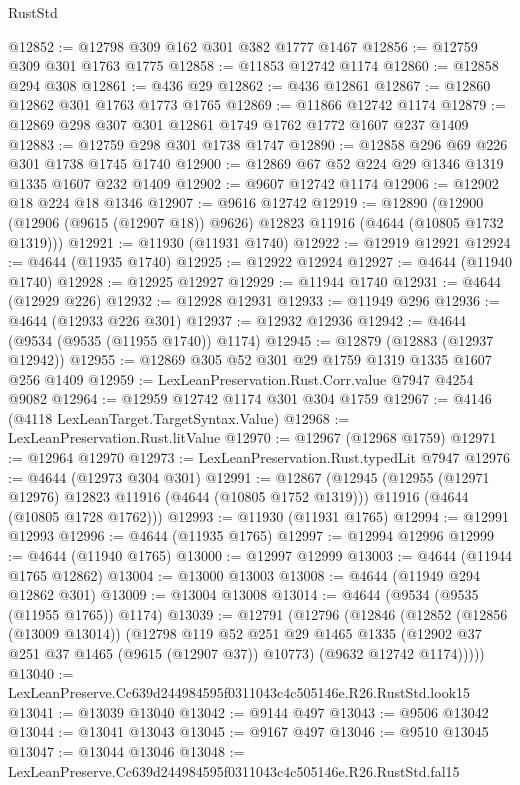 \begin{lexlean}{RustStd}
\begin{coremodule}
@12852 := @12798 @309 @162 @301 @382 @1777 @1467
@12856 := @12759 @309 @301 @1763 @1775
@12858 := @11853 @12742 @1174
@12860 := @12858 @294 @308
@12861 := @436 @29
@12862 := @436 @12861
@12867 := @12860 @12862 @301 @1763 @1773 @1765
@12869 := @11866 @12742 @1174
@12879 := @12869 @298 @307 @301 @12861 @1749 @1762 @1772 @1607 @237 @1409
@12883 := @12759 @298 @301 @1738 @1747
@12890 := @12858 @296 @69 @226 @301 @1738 @1745 @1740
@12900 := @12869 @67 @52 @224 @29 @1346 @1319 @1335 @1607 @232 @1409
@12902 := @9607 @12742 @1174
@12906 := @12902 @18 @224 @18 @1346
@12907 := @9616 @12742
@12919 := @12890
    (@12900 (@12906 (@9615 (@12907 @18)) @9626) @12823 @11916 (@4644 (@10805 @1732 @1319)))
@12921 := @11930 (@11931 @1740)
@12922 := @12919 @12921
@12924 := @4644 (@11935 @1740)
@12925 := @12922 @12924
@12927 := @4644 (@11940 @1740)
@12928 := @12925 @12927
@12929 := @11944 @1740
@12931 := @4644 (@12929 @226)
@12932 := @12928 @12931
@12933 := @11949 @296
@12936 := @4644 (@12933 @226 @301)
@12937 := @12932 @12936
@12942 := @4644 (@9534 (@9535 (@11955 @1740)) @1174)
@12945 := @12879 (@12883 (@12937 @12942))
@12955 := @12869 @305 @52 @301 @29 @1759 @1319 @1335 @1607 @256 @1409
@12959 := LexLeanPreservation.Rust.Corr.value @7947 @4254 @9082
@12964 := @12959 @12742 @1174 @301 @304 @1759
@12967 := @4146 (@4118 LexLeanTarget.TargetSyntax.Value)
@12968 := LexLeanPreservation.Rust.litValue
@12970 := @12967 (@12968 @1759)
@12971 := @12964 @12970
@12973 := LexLeanPreservation.Rust.typedLit @7947
@12976 := @4644 (@12973 @304 @301)
@12991 := @12867
    (@12945
      (@12955 (@12971 @12976) @12823 @11916 (@4644 (@10805 @1752 @1319)))
      @11916
      (@4644 (@10805 @1728 @1762)))
@12993 := @11930 (@11931 @1765)
@12994 := @12991 @12993
@12996 := @4644 (@11935 @1765)
@12997 := @12994 @12996
@12999 := @4644 (@11940 @1765)
@13000 := @12997 @12999
@13003 := @4644 (@11944 @1765 @12862)
@13004 := @13000 @13003
@13008 := @4644 (@11949 @294 @12862 @301)
@13009 := @13004 @13008
@13014 := @4644 (@9534 (@9535 (@11955 @1765)) @1174)
@13039 := @12791
    (@12796
      (@12846
        (@12852
          (@12856 (@13009 @13014))
          (@12798
            @119
            @52
            @251
            @29
            @1465
            @1335
            (@12902 @37 @251 @37 @1465 (@9615 (@12907 @37)) @10773)
            (@9632 @12742 @1174)))))
@13040 := LexLeanPreserve.Cc639d244984595f0311043c4c505146e.R26.RustStd.look15
@13041 := @13039 @13040
@13042 := @9144 @497
@13043 := @9506 @13042
@13044 := @13041 @13043
@13045 := @9167 @497
@13046 := @9510 @13045
@13047 := @13044 @13046
@13048 := LexLeanPreserve.Cc639d244984595f0311043c4c505146e.R26.RustStd.fal15

\end{coremodule}
\end{lexlean}
